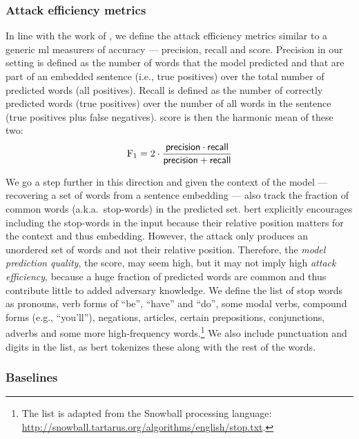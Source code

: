 			\subsubsection{Attack efficiency metrics}

				In line with the work of \textcite{embedding-attacks}, we define the attack efficiency metrics similar to a generic \acrshort{ml} measurers of accuracy --- precision, recall and \FOne{} score.
				Precision in our setting is defined as the number of words that the model predicted and that are part of an embedded sentence (i.e., true positives) over the total number of predicted words (all positives).
				Recall is defined as the number of correctly predicted words (true positives) over the number of all words in the sentence (true positives plus false negatives).
				\FOne{} score is then the harmonic mean of these two:
				\[
					\text{F}_1 = 2 \cdot \frac{ \mathsf{precision} \cdot \mathsf{recall} }{ \mathsf{precision} + \mathsf{recall} }
				\]

				We go a step further in this direction and given the context of the model --- recovering a set of words from a sentence embedding --- also track the fraction of common words (a.k.a.\ stop-words) in the predicted set.
				\acrshort{bert} explicitly encourages including the stop-words in the input because their relative position matters for the context and thus embedding.
				However, the attack only produces an unordered set of words and not their relative position.
				Therefore, the \emph{model prediction quality}, the \FOne{} score, may seem high, but it may not imply high \emph{attack efficiency}, because a huge fraction of predicted words are common and thus contribute little to added adversary knowledge.
				We define the list of stop words as pronouns, verb forms of ``be'', ``have'' and ``do'', some modal verbs, compound forms (e.g., ``you'll''), negations, articles, certain prepositions, conjunctions, adverbs and some more high-frequency words.\footnote{
					The list is adapted from the Snowball processing language: \url{http://snowball.tartarus.org/algorithms/english/stop.txt}.
				}
				We also include punctuation and digits in the list, as \acrshort{bert} tokenizes these along with the rest of the words.

			\subsubsection{Baselines}\label{section:knn-snapshot:attacks:experiments:baselines}

